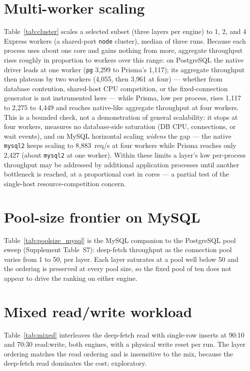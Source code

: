 \documentclass[11pt,a4paper]{article}
\newcommand{\tabledir}{tables/}
\begin{document}
\section{Multi-worker scaling}
\label{sup:cluster}
Table~\ref{tab:cluster} scales a selected subset (three layers per engine) to 1, 2, and 4
Express workers (a shared-port \texttt{node} cluster), median of three runs. Because each process
uses about one core and gains nothing from more, aggregate throughput rises roughly in proportion
to workers over this range: on PostgreSQL the native driver leads at one worker
(\texttt{pg} 3{,}299 to Prisma's 1{,}117); its aggregate throughput then plateaus by two
workers (4{,}055, then 3{,}961 at four) --- whether from database contention, shared-host CPU
competition, or the fixed-connection generator is not instrumented here --- while Prisma, low per
process, rises 1{,}117 to 2{,}275 to 4{,}449 and reaches native-like aggregate
throughput at four workers. This is a bounded check, not a demonstration of general scalability:
it stops at four workers, measures no database-side saturation (DB CPU, connections, or wait
events), and on MySQL horizontal scaling \emph{widens} the gap --- the native \texttt{mysql2}
keeps scaling to 8{,}883~req/s at four workers while Prisma reaches only 2{,}427 (about
\texttt{mysql2} at one worker). Within these limits a layer's low per-process throughput may be
addressed by additional application processes until another bottleneck is reached, at a
proportional cost in cores --- a partial test of the single-host resource-competition concern.



\section{Pool-size frontier on MySQL}
\label{sup:poolsize-mysql}
Table~\ref{tab:poolsize_mysql} is the MySQL companion to the PostgreSQL pool sweep
(Supplement Table~S7): deep-fetch throughput as the connection pool varies from 1 to
50, per layer. Each layer saturates at a pool well below 50 and the ordering is
preserved at every pool size, so the fixed pool of ten does not appear to drive the ranking on
either engine.



\section{Mixed read/write workload}
\label{sup:mixed}
Table~\ref{tab:mixed} interleaves the deep-fetch read with single-row inserts at
90:10 and 70:30 read:write, both engines, with a physical write reset per run. The
layer ordering matches the read ordering and is insensitive to the mix, because the
deep-fetch read dominates the cost; exploratory.
\end{document}
